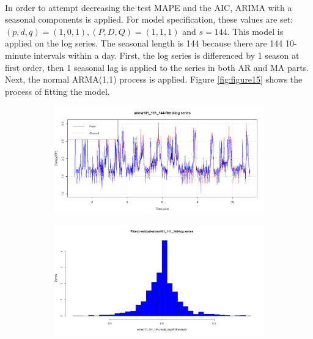 \documentclass[12pt]{article}
\begin{document}
\paragraph{}
In order to attempt decreasing the test MAPE and the AIC, ARIMA with a seasonal components is applied. For model specification, these values are set: $(p,d,q)=(1,0,1), (P,D,Q)=(1,1,1)$ and $s=144$. This model is applied on the log series. The seasonal length is 144 because there are 144 10-minute intervals within a day. First, the log series is differenced by 1 season at first order, then 1 seasonal lag is applied to the series in both AR and MA parts. Next, the normal ARMA(1,1) process is applied. Figure \ref{fig:figure15} shows the process of fitting the model.
\begin{figure}[H]
  \centering
  \begin{subfigure}[b]{0.49\linewidth}
    \includegraphics[width=\linewidth]{figure15-1.png}
  \end{subfigure}
  \begin{subfigure}[b]{0.49\linewidth}
    \includegraphics[width=\linewidth]{figure15-2.png}
  \end{subfigure}
  \begin{subfigure}[b]{0.49\linewidth}

\end{subfigure}
\end{figure}
\end{document}
